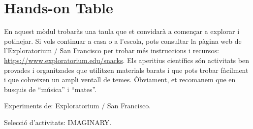 \section{Hands-on Table}
En aquest mòdul trobaràs una taula que et convidarà a començar a explorar i potinejar. Si vols continuar a casa o a l'escola, pots consultar la pàgina web de l'Exploratorium / San Francisco per trobar més instruccions i recursos: \url{https://www.exploratorium.edu/snacks}. Els aperitius científics són activitats ben provades i organitzades que utilitzen materials barats i que pots trobar fàcilment i que cobreixen un ampli ventall de temes. Òbviament, et recomanem que en busquis de ``música'' i ``mates''.

\begin{sectcredits}
\item[Experiments de:] Exploratorium / San Francisco.
\item[Selecció d'activitats:] IMAGINARY.
\end{sectcredits}
